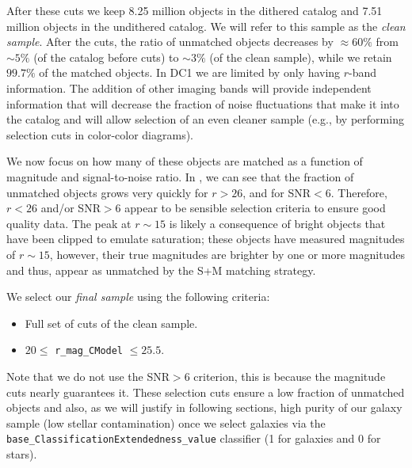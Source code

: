\documentclass[a4paper,fleqn,usenatbib]{mnras}
\begin{document}
After these cuts we keep 8.25 million objects in the dithered catalog and 7.51 million objects in the undithered catalog. We will refer to this sample as the \textit{clean sample}. After the cuts, the ratio of unmatched objects decreases by $\approx 60\%$ from $\sim 5\%$ (of the catalog before cuts) to $\sim 3\%$ (of the clean sample), while we retain $99.7\%$ of the matched objects. In DC1 we are limited by only having $r$-band information. The addition of other imaging bands will provide independent information that will decrease the fraction of noise fluctuations that make it into the catalog and will allow selection of an even cleaner sample (e.g., by performing selection cuts in color-color diagrams).


We now focus on how many of these objects are matched as a function of magnitude and signal-to-noise ratio. In , we can see that the fraction of unmatched objects grows very quickly for $r > 26$, and for SNR$<6$. Therefore, $r < 26$ and/or SNR$>6$ appear to be sensible selection criteria to ensure good quality data. The peak at $r \sim 15$ is likely a consequence of bright objects that have been clipped to emulate saturation; these objects have measured magnitudes of $r \sim 15$, however, their true magnitudes are brighter by one or more magnitudes and thus, appear as unmatched by the \textsf{S+M} matching strategy. 

We select our \textit{final sample} using the following criteria:

\begin{itemize}
\item Full set of cuts of the clean sample.
\item $20 \leq$ \texttt{r\_mag\_CModel} $\leq 25.5$. 
\end{itemize}
Note that we do not use the SNR$>6$ criterion, this is because the magnitude cuts nearly guarantees it.
These selection cuts ensure a low fraction of unmatched objects and also, as we will justify in following sections, high purity of our galaxy sample (low stellar contamination) once we select galaxies via the \texttt{base\_ClassificationExtendedness\_value} classifier (1 for galaxies and 0 for stars).
\end{document}
